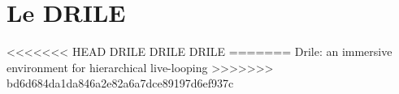 \section{Le DRILE}
\begin{frame}
<<<<<<< HEAD
  DRILE DRILE DRILE
=======
Drile: an immersive environment for hierarchical live-looping
>>>>>>> bd6d684da1da846a2e82a6a7dce89197d6ef937c
\end{frame}

